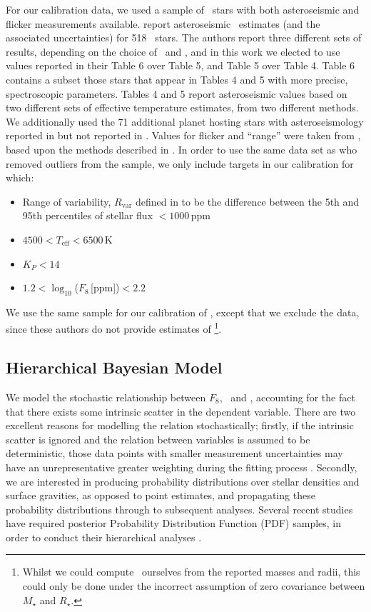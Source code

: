 For our calibration data, we used a sample of \Kepler\ stars with
both asteroseismic and flicker measurements available. \citet{Chaplin2014}
report asteroseismic \rhostar\ estimates (and the associated uncertainties) for
518 \Kepler\ stars. The authors report three different sets of results,
depending on the choice of \Teff\ and \FeH, and in this work we elected to use
values reported in their Table 6 over Table 5, and Table 5 over Table 4.
Table 6 contains a subset those stars that appear in Tables 4 and 5 with more
precise, spectroscopic parameters.
Tables 4 and 5 report asteroseismic values based on two different sets of
effective temperature estimates, from two different methods.
We additionally used the 71 additional planet hosting stars with
asteroseismology reported in \citet{Huber2013} but not reported in
\citet{Chaplin2014}. Values
for flicker and ``range'' were taken from \citet{Kipping2014}, based upon the
methods described in \citet{Bastien2013}.
In order to use the same data set as \citet{Kipping2014} who removed outliers
from the sample, we only include targets in our calibration for which:
\begin{itemize}
\item Range of variability, $R_{\mathrm{var}}$ defined in \citet{Bastien2013}
to be the difference between the 5th and 95th percentiles of stellar flux
$<1000$\,ppm
\item $4500<T_{\mathrm{eff}}<6500$\,K
\item $K_P<14$
\item $1.2 < \log_{10}$($F_8$\,[ppm])$< 2.2$
\end{itemize}

We use the same sample for our calibration of \logg, except that we exclude the
\citet{Huber2013} data, since these authors do not provide estimates of
\logg\footnote{Whilst we could compute \logg\ ourselves from the reported
masses and radii, this could only be done under the incorrect assumption of
zero covariance between $M_{\star}$ and $R_{\star}$.}.

\subsection{Hierarchical Bayesian Model}

We model the stochastic relationship between $F_8$, \logg\ and \rhostar,
accounting for the fact that there exists some intrinsic scatter in
the dependent variable.
There are two excellent reasons for modelling the relation stochastically;
firstly, if the intrinsic scatter is ignored and the relation between
variables is assumed to be deterministic, those data points with smaller
measurement uncertainties may have an unrepresentative greater weighting
during the fitting process \citep{Hogg2010b}.
Secondly, we are interested in producing probability distributions over
stellar densities and surface gravities, as opposed to point estimates, and
propagating these probability distributions through to subsequent analyses.
Several recent studies have required posterior Probability Distribution
Function (PDF) samples, in order to conduct their hierarchical analyses
\citep[e.g.][]{Foreman-Mackey2014, Rogers2015, Angus2015}.

